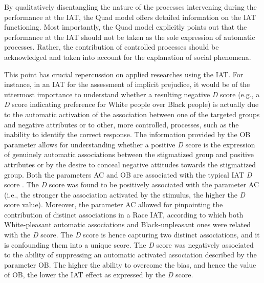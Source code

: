 \documentclass[12pt]{book}
\begin{document}
By qualitatively disentangling the nature of the processes intervening during the performance at the IAT, the Quad model offers detailed information on the IAT functioning. 
Most importantly, the Quad model explicitly points out that the performance at the IAT should not be taken as the sole expression of automatic processes. Rather, the contribution of controlled processes should be acknowledged and taken into account for the explanation of social phenomena. 

This point has crucial repercussion on applied researches using the IAT.
For instance, in an IAT for the assessment of implicit prejudice, it would be of the uttermost importance to understand whether a resulting negative \emph{D} score (e.g., a \emph{D} score indicating preference for White people over Black people) is actually due to the automatic activation of the association between one of the targeted groups and negative attributes or to other, more controlled, processes, such as the inability to identify the correct response.  
The information provided by the OB parameter allows for understanding whether a positive \emph{D} score is the expression of genuinely automatic associations between the stigmatized group and positive attributes or by the desire to conceal negative attitudes towards the stigmatized group.
Both the parameters AC and OB are associated with the typical IAT \emph{D} score \cite{Conrey2005}.
The \emph{D} score was found to be positively associated with the parameter AC (i.e., the stronger the association activated by the stimulus, the higher the \emph{D} score value). 
Moreover, the parameter AC allowed for pinpointing the contribution of distinct associations in a Race IAT, according to which both White-pleasant  automatic associations and Black-unpleasant ones were related with the \emph{D} score. The \emph{D} score is hence capturing two distinct associations, and it is confounding them into a unique score. 
The \emph{D} score was negatively associated to the ability of suppressing an automatic activated association described by the parameter OB. The higher the ability to overcome the bias, and hence the value of OB, the lower the IAT effect as expressed by the \emph{D} score.
\end{document}

